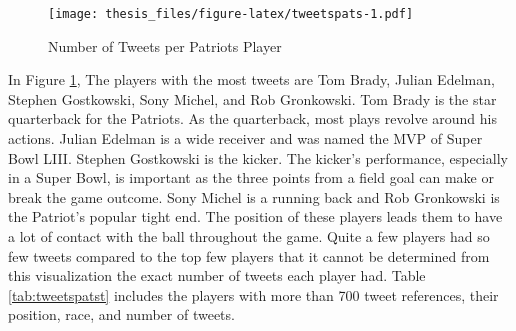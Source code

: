 \documentclass[12pt,twoside]{reedthesis}
\newenvironment{Shaded}{\begin{snugshade}}{\end{snugshade}}
\newcommand{\KeywordTok}[1]{\textcolor[rgb]{0.13,0.29,0.53}{\textbf{#1}}}
\newcommand{\DataTypeTok}[1]{\textcolor[rgb]{0.13,0.29,0.53}{#1}}
\newcommand{\DecValTok}[1]{\textcolor[rgb]{0.00,0.00,0.81}{#1}}
\newcommand{\StringTok}[1]{\textcolor[rgb]{0.31,0.60,0.02}{#1}}
\newcommand{\CommentTok}[1]{\textcolor[rgb]{0.56,0.35,0.01}{\textit{#1}}}
\newcommand{\OtherTok}[1]{\textcolor[rgb]{0.56,0.35,0.01}{#1}}
\newcommand{\OperatorTok}[1]{\textcolor[rgb]{0.81,0.36,0.00}{\textbf{#1}}}
\newcommand{\NormalTok}[1]{#1}
\begin{document}
\small
\begin{Shaded}
\end{Shaded}
\begin{figure}
\centering
\texttt{[image: thesis\_files/figure-latex/tweetspats-1.pdf]}
\caption{\label{fig:tweetspats}Number of Tweets per Patriots Player}
\end{figure}
\normalsize
In Figure \ref{fig:tweetspats}, The players with the most tweets are Tom
Brady, Julian Edelman, Stephen Gostkowski, Sony Michel, and Rob
Gronkowski. Tom Brady is the star quarterback for the Patriots. As the
quarterback, most plays revolve around his actions. Julian Edelman is a
wide receiver and was named the MVP of Super Bowl LIII. Stephen
Gostkowski is the kicker. The kicker's performance, especially in a
Super Bowl, is important as the three points from a field goal can make
or break the game outcome. Sony Michel is a running back and Rob
Gronkowski is the Patriot's popular tight end. The position of these
players leads them to have a lot of contact with the ball throughout the
game. Quite a few players had so few tweets compared to the top few
players that it cannot be determined from this visualization the exact
number of tweets each player had. Table \ref{tab:tweetspatst} includes
the players with more than 700 tweet references, their position, race,
and number of tweets.
\end{document}
